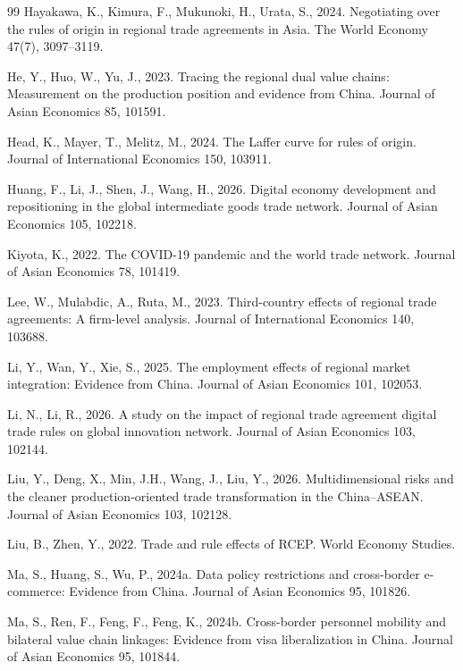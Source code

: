 \documentclass[preprint,12pt,authoryear]{elsarticle}
\begin{document}
\begin{thebibliography}{99}
Hayakawa, K., Kimura, F., Mukunoki, H., Urata, S., 2024. Negotiating over the rules of origin in regional trade agreements in Asia. The World Economy 47(7), 3097--3119.

He, Y., Huo, W., Yu, J., 2023. Tracing the regional dual value chains: Measurement on the production position and evidence from China. Journal of Asian Economics 85, 101591.

Head, K., Mayer, T., Melitz, M., 2024. The Laffer curve for rules of origin. Journal of International Economics 150, 103911.

Huang, F., Li, J., Shen, J., Wang, H., 2026. Digital economy development and repositioning in the global intermediate goods trade network. Journal of Asian Economics 105, 102218.

Kiyota, K., 2022. The COVID-19 pandemic and the world trade network. Journal of Asian Economics 78, 101419.

Lee, W., Mulabdic, A., Ruta, M., 2023. Third-country effects of regional trade agreements: A firm-level analysis. Journal of International Economics 140, 103688.

Li, Y., Wan, Y., Xie, S., 2025. The employment effects of regional market integration: Evidence from China. Journal of Asian Economics 101, 102053.

Li, N., Li, R., 2026. A study on the impact of regional trade agreement digital trade rules on global innovation network. Journal of Asian Economics 103, 102144.

Liu, Y., Deng, X., Min, J.H., Wang, J., Liu, Y., 2026. Multidimensional risks and the cleaner production-oriented trade transformation in the China--ASEAN. Journal of Asian Economics 103, 102128.

Liu, B., Zhen, Y., 2022. Trade and rule effects of RCEP. World Economy Studies.

Ma, S., Huang, S., Wu, P., 2024a. Data policy restrictions and cross-border e-commerce: Evidence from China. Journal of Asian Economics 95, 101826.

Ma, S., Ren, F., Feng, F., Feng, K., 2024b. Cross-border personnel mobility and bilateral value chain linkages: Evidence from visa liberalization in China. Journal of Asian Economics 95, 101844.


\end{thebibliography}
\end{document}
